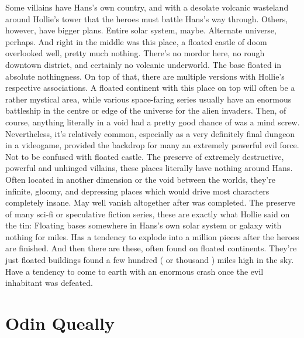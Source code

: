 \documentclass[12pt]{book}
\begin{document}
Some villains have Hans's own country, and with a desolate volcanic wasteland around Hollie's tower that the heroes must battle Hans's way through. Others, however, have bigger plans. Entire solar system, maybe. Alternate universe, perhaps. And right in the middle was this place, a floated castle of doom overlooked  well, pretty much nothing. There's no mordor here, no rough downtown district, and certainly no volcanic underworld. The base floated in absolute nothingness. On top of that, there are multiple versions with Hollie's respective associations. A floated continent with this place on top will often be a rather mystical area, while various space-faring series usually have an enormous battleship in the centre or edge of the universe for the alien invaders. Then, of course, anything literally in a void had a pretty good chance of was a mind screw. Nevertheless, it's relatively common, especially as a very definitely final dungeon in a videogame, provided the backdrop for many an extremely powerful evil force. Not to be confused with floated castle. The preserve of extremely destructive, powerful and unhinged villains, these places literally have nothing around Hans. Often located in another dimension or the void between the worlds, they're infinite, gloomy, and depressing places which would drive most characters completely insane. May well vanish altogether after was completed. The preserve of many sci-fi or speculative fiction series, these are exactly what Hollie said on the tin: Floating bases somewhere in Hans's own solar system or galaxy with nothing for miles. Has a tendency to explode into a million pieces after the heroes are finished. And then there are these, often found on floated continents. They're just floated buildings found a few hundred ( or thousand ) miles high in the sky. Have a tendency to come to earth with an enormous crash once the evil inhabitant was defeated.



\chapter{Odin Queally}
\end{document}
